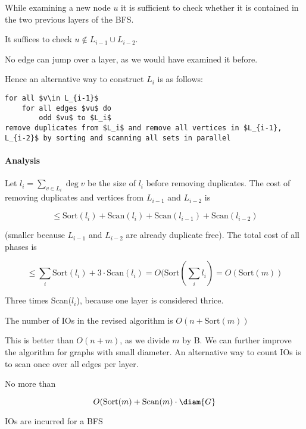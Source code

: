While examining a new node $u$ it is sufficient to check whether it is contained in the two previous layers of the BFS.

\begin{lem} It suffices to check $u\not \in L_{i-1} \cup L_{i-2}$.\end{lem}

\begin{pr} No edge can jump over a layer, as we would have examined it before.\end{pr}

Hence an alternative way to construct $L_i$ is as follows:

\begin{lstlisting}
for all $v\in L_{i-1}$
	for all edges $vu$ do
		odd $vu$ to $L_i$
remove duplicates from $L_i$ and remove all vertices in $L_{i-1}, L_{i-2}$ by sorting and scanning all sets in parallel
\end{lstlisting}

\paragraph{Analysis} Let $l_i = \sum_{v\in L_i} \deg{v}$ be the size of $l_i$ before removing duplicates. The cost of removing duplicates and vertices from $L_{i-1}$ and $L_{i-2}$ is

\[\leq \text{Sort}(l_i) + \text{Scan}(l_i) + \text{Scan}(l_{i-1}) + \text{Scan}(l_{i-2})\]

(smaller because $L_{i-1}$ and $L_{i-2}$ are already duplicate free). The total cost of all phases is

\[\leq \sum_{i} \text{Sort}(l_i) + 3\cdot \text{Scan}(l_i) = O(\text{Sort}(\sum_i l_i) = O(\text{Sort}(m))\]

Three times Scan($l_i$), because one layer is considered thrice.

\begin{thm} The number of IOs in the revised algorithm is $O(n+\text{Sort}(m))$\end{thm}

This is better than $O(n+m)$, as we divide $m$ by B. We can further improve the algorithm for graphs with small diameter. An alternative way to count IOs is to scan once over all edges per layer.

\begin{thm} No more than 

\[O(\text{Sort}(m)+\text{Scan}(m) \cdot \diam{G}\]

IOs are incurred for a BFS
\end{thm}

